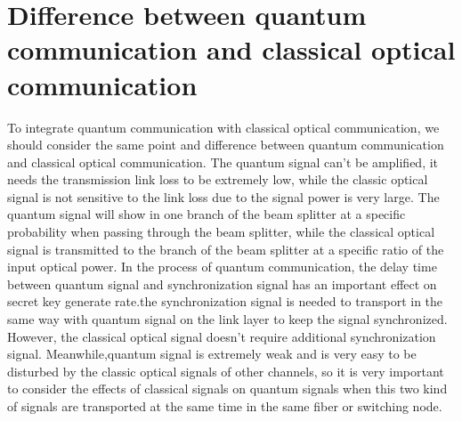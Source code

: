 \documentclass[letterpaper,10pt]{article}
\begin{document}
\section{Difference between quantum communication and classical optical communication}
To integrate quantum communication with classical optical communication, we should consider the same point and difference between quantum communication and classical optical communication. The quantum signal can't be amplified, it needs the transmission link loss to be extremely low, while the classic optical signal is not sensitive to the link loss due to the signal power is very large. The quantum signal will show in one branch of the beam splitter at a specific probability when passing through the beam splitter, while the classical optical signal is transmitted to the branch of the beam splitter at a specific ratio of the input optical power. In the process of quantum communication, the delay time between quantum signal and synchronization signal has an important effect on secret key generate rate.the synchronization signal is needed to transport in the same way with quantum signal on the link layer to keep the signal synchronized. However, the classical optical signal doesn't require additional synchronization signal. Meanwhile,quantum signal is extremely weak and is very easy to be disturbed by the classic optical signals of other channels, so it is very important to consider the effects of classical signals on quantum signals when this two kind of signals are transported at the same time in the same fiber or switching node. 
\end{document}
